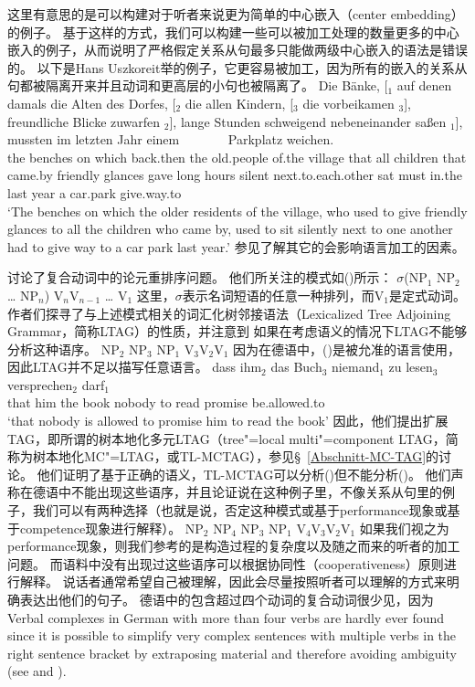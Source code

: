 \noindent
这里有意思的是可以构建对于听者来说更为简单的中心嵌入（center embedding）的例子。
基于这样的方式，我们可以构建一些可以被加工处理的数量更多的中心嵌入的例子，从而说明了严格假定关系从句最多只能做两级中心嵌入的语法是错误的。
以下是Hans Uszkoreit举的例子，它更容易被加工，因为所有的嵌入的关系从句都被隔离开来并且动词和更高层的小句也被隔离了。
\ea
\gll Die Bänke, [$_1$ auf denen damals die Alten des Dorfes, [$_2$ die allen Kindern, [$_3$ die vorbeikamen $_3$], freundliche Blicke zuwarfen $_2$], 
lange Stunden schweigend nebeneinander saßen $_1$], mussten im letzten Jahr einem~~~~~~~ Parkplatz weichen.\\
the benches {} on which back.then the old.people of.the village {} that all children {} that came.by {} friendly glances gave {}
long hours silent next.to.each.other sat {} must in.the last year a car.park give.way.to\\
\glt `The benches on which the older residents of the village, who used to give friendly glances to all the children who came by, used to sit silently next to one 
another had to give way to a car park last year.'
\z
参见了解其它的会影响语言加工的因素。

\addlines
\citet{JBR2000a}讨论了复合动词中的论元重排序问题。
他们所关注的模式如()所示：
\ea
$\sigma$(NP$_1$ NP$_2$ \ldots{} NP$_n$) V$_{n}$V$_{n-1}$ \ldots{} V$_{1}$
\z
这里，$\sigma$表示名词短语的任意一种排列，而V$_{1}$是定式动词。
作者们探寻了与上述模式相关的词汇化树邻接语法（Lexicalized Tree Adjoining Grammar，简称LTAG）的性质，并注意到
如果在考虑语义的情况下LTAG不能够分析这种语序。
\ea
NP$_2$ NP$_3$ NP$_1$ V$_{3}$V$_{2}$V$_{1}$
\z
因为在德语中，()是被允准的语言使用，因此LTAG并不足以描写任意语言。
\ea
\gll dass ihm$_2$ das Buch$_3$ niemand$_1$ zu lesen$_3$ versprechen$_2$ darf$_1$\\
     that him     the book     nobody     to read      promise         be.allowed.to\\
\glt `that nobody is allowed to promise him to read the book' 
\z
因此，他们提出扩展TAG，即所谓的树本地化多元LTAG（{tree"=local multi"=component LTAG}，简称为树本地化MC"=LTAG，或TL-MCTAG），参见\S~\ref{Abschnitt-MC-TAG}的讨论。
他们证明了基于正确的语义，TL-MCTAG可以分析()但不能分析()。
他们声称在德语中不能出现这些语序，并且论证说在这种例子里，不像关系从句里的例子，我们可以有两种选择（也就是说，否定这种模式或基于performance现象或基于competence现象进行解释）。
\ea
\label{ex-mc-ltag-fails}
NP$_2$ NP$_4$ NP$_3$ NP$_1$ V$_{4}$V$_{3}$V$_{2}$V$_{1}$
\z
如果我们视之为performance现象，则我们参考的是构造过程的复杂度以及随之而来的听者的加工问题。
而语料中没有出现过这些语序可以根据协同性（cooperativeness）原则进行解释。
说话者通常希望自己被理解，因此会尽量按照听者可以理解的方式来明确表达出他们的句子。
德语中的包含超过四个动词的复合动词很少见，因为
Verbal complexes in German with more than four verbs are hardly ever found since it is possible to simplify very complex sentences with multiple verbs in the 
right sentence bracket by extraposing material and therefore avoiding ambiguity (see \citealp[]{Netter91} and
\citealp[]{MuellerLehrbuch1}).

